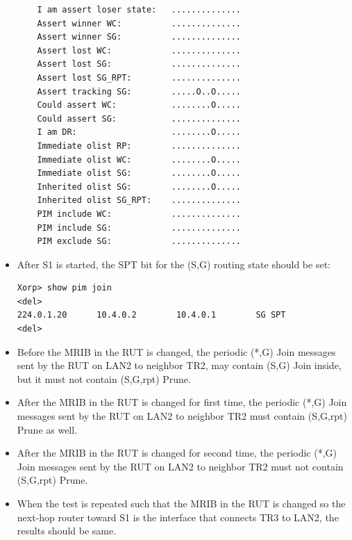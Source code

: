 \documentclass[11pt]{report}
\begin{document}
\begin{itemize}
\begin{verbatim}
    I am assert loser state:   ..............
    Assert winner WC:          ..............
    Assert winner SG:          ..............
    Assert lost WC:            ..............
    Assert lost SG:            ..............
    Assert lost SG_RPT:        ..............
    Assert tracking SG:        .....O..O.....
    Could assert WC:           ........O.....
    Could assert SG:           ..............
    I am DR:                   ........O.....
    Immediate olist RP:        ..............
    Immediate olist WC:        ........O.....
    Immediate olist SG:        ........O.....
    Inherited olist SG:        ........O.....
    Inherited olist SG_RPT:    ..............
    PIM include WC:            ..............
    PIM include SG:            ..............
    PIM exclude SG:            ..............
\end{verbatim}

  \item After S1 is started, the SPT bit for the (S,G) routing state should be
  set:

\begin{verbatim}
Xorp> show pim join 
<del>
224.0.1.20      10.4.0.2        10.4.0.1        SG SPT 
<del>
\end{verbatim}

  \item Before the MRIB in the RUT is changed, the periodic (*,G) Join
  messages sent by the RUT on LAN2 to neighbor TR2, may contain (S,G) Join
  inside, but it must not contain (S,G,rpt) Prune.

  \item After the MRIB in the RUT is changed for first time, the periodic
  (*,G) Join messages sent by the RUT on LAN2 to neighbor TR2 must contain
  (S,G,rpt) Prune as well.

  \item After the MRIB in the RUT is changed for second time, the periodic
  (*,G) Join messages sent by the RUT on LAN2 to neighbor TR2 must not contain
  (S,G,rpt) Prune.

  \item When the test is repeated such that the MRIB in the RUT is changed so
  the next-hop router toward S1 is the interface that connects TR3 to LAN2,
  the results should be same.

\end{itemize}

\end{document}
